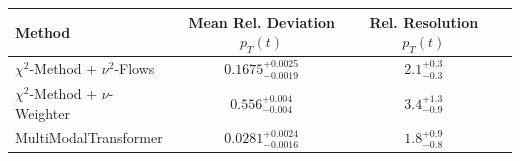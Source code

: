     \begin{tabular}{lccc}
        \toprule
        Method & Mean Rel. Deviation $p_{T}(t)$ & Rel. Resolution $p_{T}(t)$ \\
        \midrule
        $\chi^2$-Method + $\nu^2$-Flows & $0.1675^{+0.0025}_{-0.0019}$ & $2.1^{+0.3}_{-0.3}$ \\
        $\chi^2$-Method + $\nu$-Weighter & $0.556^{+0.004}_{-0.004}$ & $3.4^{+1.3}_{-0.9}$ \\
        MultiModalTransformer & $0.0281^{+0.0024}_{-0.0016}$ & $1.8^{+0.9}_{-0.8}$ \\
        \bottomrule
    \end{tabular}
